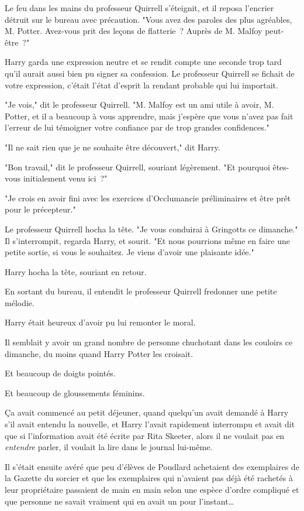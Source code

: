 Le feu dans les mains du professeur Quirrell s'éteignit, et il reposa l'encrier détruit sur le bureau avec précaution. "Vous avez des paroles des plus agréables, M. Potter. Avez-vous prit des leçons de flatterie~? Auprès de M. Malfoy peut-être~?"

Harry garda une expression neutre et se rendit compte une seconde trop tard qu'il aurait aussi bien pu signer sa confession. Le professeur Quirrell se fichait de votre expression, c'était l'état d'esprit la rendant probable qui lui importait.

"Je vois," dit le professeur Quirrell. "M. Malfoy est un ami utile à avoir, M. Potter, et il a beaucoup à vous apprendre, mais j'espère que vous n'avez pas fait l'erreur de lui témoigner votre confiance par de trop grandes confidences."

"Il ne sait rien que je ne souhaite être découvert," dit Harry.

"Bon travail," dit le professeur Quirrell, souriant légèrement. "Et pourquoi êtes-vous initialement venu ici~?"

"Je crois en avoir fini avec les exercices d'Occlumancie préliminaires et être prêt pour le précepteur."

Le professeur Quirrell hocha la tête. "Je vous conduirai à Gringotts ce dimanche." Il s'interrompit, regarda Harry, et sourit. "Et nous pourrions même en faire une petite sortie, si vous le souhaitez. Je viens d'avoir une plaisante idée."

Harry hocha la tête, souriant en retour.

En sortant du bureau, il entendit le professeur Quirrell fredonner une petite mélodie.

Harry était heureux d'avoir pu lui remonter le moral.

\later

Il semblait y avoir un grand nombre de personne chuchotant dans les couloirs ce dimanche, du moins quand Harry Potter les croisait.

Et beaucoup de doigts pointés.

Et beaucoup de gloussements féminins.

Ça avait commencé au petit déjeuner, quand quelqu'un avait demandé à Harry s'il avait entendu la nouvelle, et Harry l'avait rapidement interrompu et avait dit que si l'information avait été écrite par Rita Skeeter, alors il ne voulait pas en \emph{entendre} parler, il voulait la lire dans le journal lui-même.

Il s'était ensuite avéré que peu d'élèves de Poudlard achetaient des exemplaires de la Gazette du sorcier et que les exemplaires qui n'avaient pas déjà été rachetés à leur propriétaire passaient de main en main selon une espèce d'ordre compliqué et que personne ne savait vraiment qui en avait un pour l'instant…

